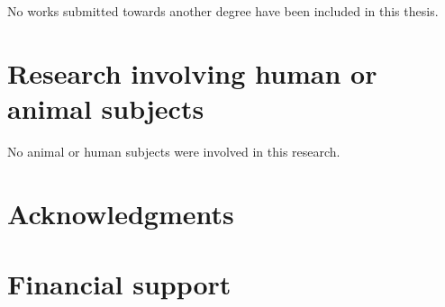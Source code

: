 No works submitted towards another degree have been included in this thesis.

\section*{Research involving human or animal subjects}

No animal or human subjects were involved in this research.

\clearpage

\section*{Acknowledgments}



\clearpage

\section*{Financial support}






